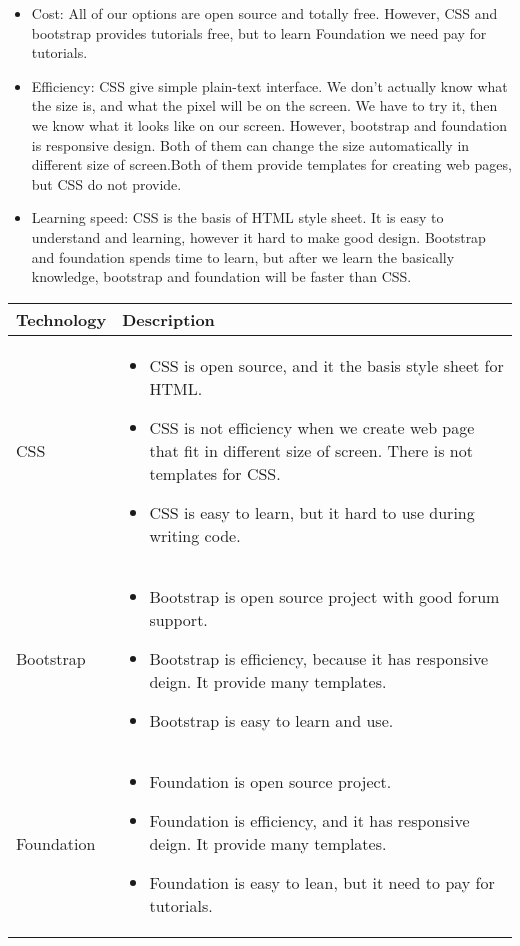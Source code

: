 \begin{itemize}
  \item {
    Cost:
    All of our options are open source and totally free.
    However, CSS and bootstrap provides tutorials free, but to learn Foundation we need pay for tutorials.
  }
  \item {
    Efficiency:
    CSS give simple plain-text interface.
    We don't actually know what the size is, and what the pixel will be on the screen.
    We have to try it, then we know what it looks like on our screen.
    However, bootstrap and foundation is responsive design.
    Both of them can change the size automatically in different size of screen.Both of them provide templates for creating web pages, but CSS do not provide.
  }
  \item {
    Learning speed: CSS is the basis of HTML style sheet.
    It is easy to understand and learning, however it hard to make good design.
    Bootstrap and foundation spends time to learn, but after we learn the basically knowledge, bootstrap and foundation will be faster than CSS.
  }
\end{itemize}

\begin{center}
    \begin{tabular}{ | l | p{10cm} |}
    \hline
    Technology & Description  \\ \hline
    CSS \cite{CSS_intro}&
    \begin{itemize}
      \item CSS is open source, and it the basis style sheet for HTML.
      \item CSS is not efficiency when we create web page that fit in different size of screen. There is not templates for CSS.
      \item CSS is easy to learn, but it hard to use during writing code.
    \end{itemize}\\ \hline
    Bootstrap \cite{boot_intro}&
    \begin{itemize}
      \item Bootstrap is open source project with good forum support.
      \item Bootstrap is efficiency, because it has responsive deign. It provide many templates.
      \item Bootstrap is easy to learn and use.
    \end{itemize}\\ \hline
    Foundation \cite{foundation_intro}&
    \begin{itemize}
      \item Foundation is open source project.
      \item Foundation is efficiency, and it has responsive deign. It provide many templates.
      \item Foundation is easy to lean, but it need to pay for tutorials.
    \end{itemize}\\ \hline
    \end{tabular}
\end{center}

